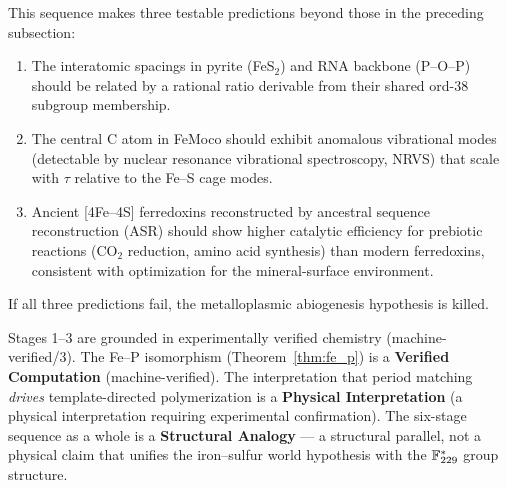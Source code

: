 \begin{remark}[Falsification]
This sequence makes three testable predictions beyond those in the preceding subsection:
\begin{enumerate}
    \item The interatomic spacings in pyrite (FeS$_2$) and RNA backbone (P--O--P) should be related by a rational ratio derivable from their shared ord-$38$ subgroup membership.
    \item The central C atom in FeMoco should exhibit anomalous vibrational modes (detectable by nuclear resonance vibrational spectroscopy, NRVS) that scale with $\tau$ relative to the Fe--S cage modes.
    \item Ancient [4Fe--4S] ferredoxins reconstructed by ancestral sequence reconstruction (ASR) should show higher catalytic efficiency for prebiotic reactions (CO$_2$ reduction, amino acid synthesis) than modern ferredoxins, consistent with optimization for the mineral-surface environment.
\end{enumerate}
If all three predictions fail, the metalloplasmic abiogenesis hypothesis is killed.
\end{remark}

\begin{remark}[Scope]
Stages 1--3 are grounded in experimentally verified chemistry (machine-verified/3). The Fe--P isomorphism (Theorem~\ref{thm:fe_p}) is a \textbf{Verified Computation} (machine-verified). The interpretation that period matching \emph{drives} template-directed polymerization is a \textbf{Physical Interpretation} (a physical interpretation requiring experimental confirmation). The six-stage sequence as a whole is a \textbf{Structural Analogy} --- a structural parallel, not a physical claim that unifies the iron--sulfur world hypothesis with the $\mathbb{F}_{229}^*$ group structure.
\end{remark}
